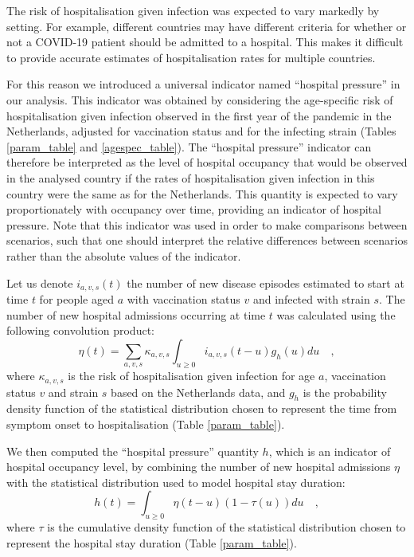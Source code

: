 The risk of hospitalisation given infection was expected to vary markedly by setting.
For example, different countries may have different criteria for whether or not a COVID-19 
patient should be admitted to a hospital. This makes it difficult to provide accurate 
estimates of hospitalisation rates for multiple countries. 

For this reason we introduced a universal indicator named ``hospital pressure'' in our analysis. This indicator
was obtained by considering the age-specific risk of hospitalisation given infection observed in the first year
of the pandemic in the Netherlands, adjusted for vaccination status and for the infecting strain (Tables \ref{param_table} and \ref{agespec_table}).
The ``hospital pressure'' indicator can therefore be interpreted as the level of hospital occupancy that
would be observed in the analysed country if the rates of hospitalisation given infection in this country were the same
as for the Netherlands. This quantity is expected to vary proportionately with occupancy over time, providing an indicator of 
hospital pressure. Note that this indicator was used in order to make comparisons between scenarios, such that one should interpret the relative
differences between scenarios rather than the absolute values of the indicator. 

Let us denote $i_{a,v,s}(t)$ the number of new disease episodes estimated to start at time $t$ for people aged $a$ with vaccination status $v$
and infected with strain $s$. The number of new hospital admissions occurring at time $t$ was calculated using the following
convolution product:
\begin{equation}
 \eta(t) = \sum_{a,v,s} \kappa_{a,v,s} \int_{u \geq 0}  i_{a,v,s}(t-u)g_{h}(u) du   \quad,
 \end{equation}
where $\kappa_{a,v,s}$ is the risk of hospitalisation given infection for age $a$, vaccination status $v$ and strain $s$ 
based on the Netherlands data, and $g_h$ is the probability density function of the statistical distribution chosen to represent the 
time from symptom onset to hospitalisation (Table \ref{param_table}). 

We then computed the ``hospital pressure'' quantity $h$, which is an indicator of hospital occupancy level, by combining the number of new 
hospital admissions $\eta$ with the statistical distribution used to model hospital stay duration:
\begin{equation}
h(t) = \int_{u \geq 0}  \eta(t-u) (1 - \tau(u)) du   \quad,
\end{equation}
where $\tau$ is the cumulative density function of the statistical distribution chosen to represent the 
hospital stay duration (Table \ref{param_table}). 
